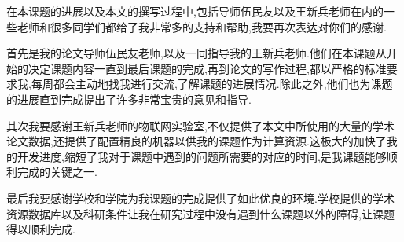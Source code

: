 
\begin{thanks}

在本课题的进展以及本文的撰写过程中,包括导师伍民友以及王新兵老师在内的一些老师和很多同学们都给了我非常多的支持和帮助,我要再次表达对你们的感谢.

首先是我的论文导师伍民友老师,以及一同指导我的王新兵老师.他们在本课题从开始的决定课题内容一直到最后课题的完成,再到论文的写作过程,都以严格的标准要求我,每周都会主动地找我进行交流,了解课题的进展情况.除此之外,他们也为课题的进展直到完成提出了许多非常宝贵的意见和指导.

其次我要感谢王新兵老师的物联网实验室,不仅提供了本文中所使用的大量的学术论文数据,还提供了配置精良的机器以供我的课题作为计算资源.这极大的加快了我的开发进度,缩短了我对于课题中遇到的问题所需要的对应的时间,是我课题能够顺利完成的关键之一.

最后我要感谢学校和学院为我课题的完成提供了如此优良的环境.学校提供的学术资源数据库以及科研条件让我在研究过程中没有遇到什么课题以外的障碍,让课题得以顺利完成.


\end{thanks}

